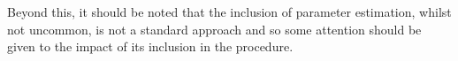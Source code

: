 Beyond this, it should be noted that the inclusion of parameter estimation,
whilst not uncommon, is not a standard approach and so some attention should be
given to the impact of its inclusion in the procedure.






